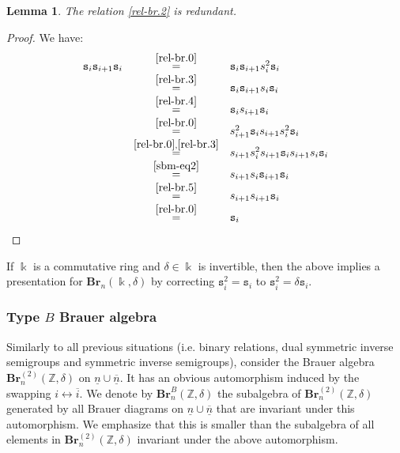\documentclass[a4paper]{amsart}
\newtheorem{lemma}[theorem]{Lemma}
\begin{document}
\begin{lemma}
The relation \eqref{rel-br.2} is redundant.
\end{lemma}

\begin{proof}
We have:
\begin{displaymath}
\begin{array}{rcl}
\mathtt{s}_i\mathtt{s}_{i+1}\mathtt{s}_i
&\overset{\eqref{rel-br.0}}{=}&\mathtt{s}_i\mathtt{s}_{i+1}s_i^2\mathtt{s}_i\\
&\overset{\eqref{rel-br.3}}{=}&\mathtt{s}_i\mathtt{s}_{i+1}s_i\mathtt{s}_i\\
&\overset{\eqref{rel-br.4}}{=}&\mathtt{s}_is_{i+1}\mathtt{s}_i\\
&\overset{\eqref{rel-br.0}}{=}&s_{i+1}^2\mathtt{s}_is_{i+1}s_i^2\mathtt{s}_i\\
&\overset{\eqref{rel-br.0},\eqref{rel-br.3}}{=}&
s_{i+1}s_i^2s_{i+1}\mathtt{s}_is_{i+1}s_i\mathtt{s}_i\\
&\overset{\eqref{sbm-eq2}}{=}&
s_{i+1}s_i\mathtt{s}_{i+1}\mathtt{s}_i\\
&\overset{\eqref{rel-br.5}}{=}&
s_{i+1}s_{i+1}\mathtt{s}_i\\
&\overset{\eqref{rel-br.0}}{=}&
\mathtt{s}_i\\
\end{array}
\end{displaymath}

 
\end{proof}


If $\Bbbk$ is a commutative ring and $\delta\in\Bbbk$ is invertible, then
the above implies a presentation for $\mathbf{Br}_n(\Bbbk,\delta)$ by
correcting $\mathtt{s}_i^2=\mathtt{s}_i$ to $\mathtt{s}_i^2=\delta\mathtt{s}_i$.

\subsubsection{Type $B$ Brauer algebra}\label{s4.4.4}

Similarly to all previous situations (i.e. binary relations, dual symmetric inverse
semigroups and symmetric inverse semigroups), consider the Brauer
algebra $\mathbf{Br}_n^{(2)}(\mathbb{Z},\delta)$ on 
$\underline{n}\cup\underline{\overline{n}}$. It has an obvious automorphism
induced by the swapping $i\leftrightarrow\overline{i}$. We denote by 
$\mathbf{Br}_n^B(\mathbb{Z},\delta)$ the subalgebra of 
$\mathbf{Br}_n^{(2)}(\mathbb{Z},\delta)$ generated by all
Brauer diagrams on $\underline{n}\cup\underline{\overline{n}}$ that are
invariant under this automorphism. We emphasize that this is smaller than
the subalgebra of all elements in $\mathbf{Br}_n^{(2)}(\mathbb{Z},\delta)$
invariant under the above automorphism.
\end{document}

